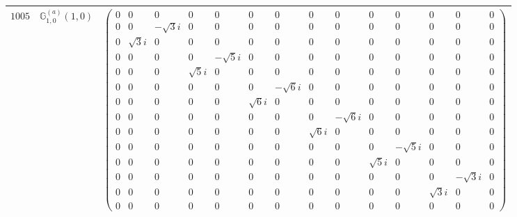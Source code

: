 \documentclass[fleqn,8pt,landscape]{jsarticle}
\begin{document}
\begin{center}
\begin{longtable}{ccc}
$ 1005 $ & $ \mathbb{G}_{1,0}^{(a)}(1,0) $ & $ \begin{pmatrix} 0 & 0 & 0 & 0 & 0 & 0 & 0 & 0 & 0 & 0 & 0 & 0 & 0 & 0 \\ 0 & 0 & - \sqrt{3} i & 0 & 0 & 0 & 0 & 0 & 0 & 0 & 0 & 0 & 0 & 0 \\ 0 & \sqrt{3} i & 0 & 0 & 0 & 0 & 0 & 0 & 0 & 0 & 0 & 0 & 0 & 0 \\ 0 & 0 & 0 & 0 & - \sqrt{5} i & 0 & 0 & 0 & 0 & 0 & 0 & 0 & 0 & 0 \\ 0 & 0 & 0 & \sqrt{5} i & 0 & 0 & 0 & 0 & 0 & 0 & 0 & 0 & 0 & 0 \\ 0 & 0 & 0 & 0 & 0 & 0 & - \sqrt{6} i & 0 & 0 & 0 & 0 & 0 & 0 & 0 \\ 0 & 0 & 0 & 0 & 0 & \sqrt{6} i & 0 & 0 & 0 & 0 & 0 & 0 & 0 & 0 \\ 0 & 0 & 0 & 0 & 0 & 0 & 0 & 0 & - \sqrt{6} i & 0 & 0 & 0 & 0 & 0 \\ 0 & 0 & 0 & 0 & 0 & 0 & 0 & \sqrt{6} i & 0 & 0 & 0 & 0 & 0 & 0 \\ 0 & 0 & 0 & 0 & 0 & 0 & 0 & 0 & 0 & 0 & - \sqrt{5} i & 0 & 0 & 0 \\ 0 & 0 & 0 & 0 & 0 & 0 & 0 & 0 & 0 & \sqrt{5} i & 0 & 0 & 0 & 0 \\ 0 & 0 & 0 & 0 & 0 & 0 & 0 & 0 & 0 & 0 & 0 & 0 & - \sqrt{3} i & 0 \\ 0 & 0 & 0 & 0 & 0 & 0 & 0 & 0 & 0 & 0 & 0 & \sqrt{3} i & 0 & 0 \\ 0 & 0 & 0 & 0 & 0 & 0 & 0 & 0 & 0 & 0 & 0 & 0 & 0 & 0 \end{pmatrix} $ \\ \hline

\end{longtable}
\end{center}
\end{document}
